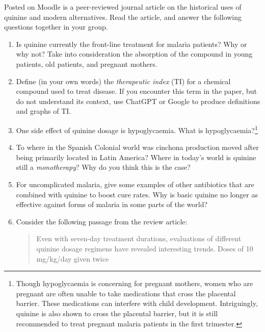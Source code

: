 \documentclass[12pt]{article}
\begin{document}
Posted on Moodle is a peer-reviewed journal article on the historical uses of quinine and modern alternatives.  Read the article, and answer the following questions together in your group.

\begin{enumerate}
\item Is quinine currently the front-line treatment for malaria patients?  Why or why not?  Take into consideration the absorption of the compound in young patients, old patients, and pregnant mothers.  \\ \vspace{3cm}
\item Define (in your own words) the \textit{therapeutic index} (TI) for a chemical compound used to treat disease.  If you encounter this term in the paper, but do not understand its context, use ChatGPT or Google to produce definitions and graphs of TI. \\ \vspace{2cm}
\item One side effect of quinine dosage is hypoglycaemia.  What is hypoglycaemia?\footnote{Though hypoglycaemia is concerning for pregnant mothers, women who are pregnant are often unable to take medications that cross the placental barrier.  These medications can interfere with child development.  Intriguingly, quinine is also shown to cross the placental barrier, but it is still recommended to treat pregnant malaria patients in the first trimester.} \\ \vspace{1cm}
\item To where in the Spanish Colonial world was cinchona production moved after being primarily located in Latin America?  Where in today's world is quinine still a \textit{monotherapy}?  Why do you think this is the case? \\ \vspace{2cm}
\item For uncomplicated malaria, give some examples of other antibiotics that are combined with quinine to boost cure rates.  Why is basic quinine no longer as effective against forms of malaria in some parts of the world?  \\ \vspace{2cm}
\item Consider the following passage from the review article:
\begin{quotation}
Even with seven-day treatment durations, evaluations
of different quinine dosage regimens have revealed
interesting trends. Doses of 10 mg/kg/day given twice

\end{quotation}
\end{enumerate}
\end{document}
